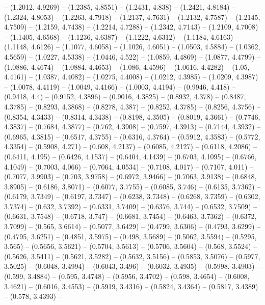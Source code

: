 {  -- (1.2012, 4.9269) -- (1.2385, 4.8551) -- (1.2431, 4.838) -- (1.2421, 4.8184)
   -- (1.2324, 4.8053) -- (1.2263, 4.7918) -- (1.2137, 4.7631) -- (1.2132, 
  4.7587) -- (1.2145, 4.7509) -- (1.2159, 4.7438) -- (1.2214, 4.7288) -- 
  (1.2342, 4.7143) -- (1.2109, 4.7008) -- (1.1405, 4.6568) -- (1.1236, 4.6387) 
  -- (1.1222, 4.6312) -- (1.1184, 4.6163) -- (1.1148, 4.6126) -- (1.1077, 
  4.6058) -- (1.1026, 4.6051) -- (1.0503, 4.5884) -- (1.0362, 4.5659) -- 
  (1.0227, 4.5338) -- (1.0446, 4.522) -- (1.0859, 4.4869) -- (1.0877, 4.4799) --
   (1.0886, 4.4674) -- (1.0884, 4.4653) -- (1.086, 4.4596) -- (1.0616, 4.4282) 
  -- (1.05, 4.4161) -- (1.0387, 4.4082) -- (1.0275, 4.4008) -- (1.0212, 4.3985) 
  -- (1.0209, 4.3987) -- (1.0078, 4.4119) -- (1.0049, 4.4166) -- (1.0003, 
  4.4194) -- (0.9946, 4.418) -- (0.9418, 4.4) -- (0.9152, 4.3896) -- (0.9016, 
  4.3825) -- (0.8932, 4.378) -- (0.8487, 4.3785) -- (0.8293, 4.3868) -- (0.8278,
   4.387) -- (0.8252, 4.3785) -- (0.8256, 4.3756) -- (0.8354, 4.3433) -- 
  (0.8314, 4.3438) -- (0.8198, 4.3505) -- (0.8019, 4.3661) -- (0.7746, 4.3837) 
  -- (0.7684, 4.3877) -- (0.762, 4.3908) -- (0.7597, 4.3913) -- (0.7144, 4.3932)
   -- (0.6965, 4.3815) -- (0.6517, 4.3755) -- (0.6316, 4.3764) -- (0.5912, 
  4.3583) -- (0.5772, 4.3354) -- (0.5908, 4.271) -- (0.608, 4.2137) -- (0.6085, 
  4.2127) -- (0.6118, 4.2086) -- (0.6411, 4.195) -- (0.6426, 4.1537) -- (0.6404,
   4.1439) -- (0.6703, 4.1095) -- (0.6766, 4.1049) -- (0.7003, 4.066) -- 
  (0.7064, 4.0534) -- (0.7108, 4.017) -- (0.7107, 4.011) -- (0.7077, 3.9903) -- 
  (0.703, 3.9758) -- (0.6972, 3.9466) -- (0.7063, 3.9138) -- (0.6848, 3.8905) --
   (0.6186, 3.8071) -- (0.6077, 3.7755) -- (0.6085, 3.746) -- (0.6135, 3.7362) 
  -- (0.6179, 3.7349) -- (0.6197, 3.7347) -- (0.6238, 3.7348) -- (0.6268, 
  3.7359) -- (0.6302, 3.7374) -- (0.632, 3.7392) -- (0.6331, 3.7409) -- (0.6376,
   3.744) -- (0.6532, 3.7509) -- (0.6631, 3.7548) -- (0.6718, 3.747) -- (0.6681,
   3.7454) -- (0.6463, 3.7362) -- (0.6372, 3.7099) -- (0.565, 3.6614) -- 
  (0.5077, 3.6429) -- (0.4799, 3.6306) -- (0.4793, 3.6299) -- (0.4795, 3.6251) 
  -- (0.4851, 3.5975) -- (0.498, 3.5689) -- (0.5062, 3.5594) -- (0.5295, 3.565) 
  -- (0.5656, 3.5621) -- (0.5704, 3.5613) -- (0.5706, 3.5604) -- (0.568, 3.5524)
   -- (0.5626, 3.5411) -- (0.5621, 3.5282) -- (0.5632, 3.5156) -- (0.5853, 
  3.5076) -- (0.5977, 3.5025) -- (0.6048, 3.4994) -- (0.6043, 3.496) -- (0.6032,
   3.4935) -- (0.5998, 3.4903) -- (0.599, 3.4884) -- (0.595, 3.4748) -- (0.5956,
   3.4702) -- (0.598, 3.4654) -- (0.6008, 3.4621) -- (0.6016, 3.4553) -- 
  (0.5919, 3.4316) -- (0.5824, 3.4364) -- (0.5817, 3.4389) -- (0.578, 3.4393) --
}
